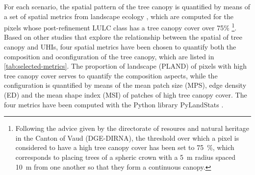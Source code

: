 \documentclass[10pt,letterpaper]{article}
\begin{document}
For each scenario, the spatial pattern of the tree canopy is quantified by means of a set of spatial metrics from landscape ecology \cite{o1988indices,mcgarigal2012fragstats}, which are computed for the pixels whose post-refinement LULC class has a tree canopy cover over 75\% \footnote{Following the advice given by the directorate of resoures and natural heritage in the Canton of Vaud (DGE-DIRNA), the threshold over which a pixel is considered to have a high tree canopy cover has been set to 75~\%, which corresponds to placing trees of a spheric crown with a 5~m radius spaced 10~m from one another so that they form a continuous canopy.}.
Based on other studies that explore the relationship between the spatial of tree canopy and UHIs, four spatial metrics have been chosen to quantify both the composition and oconfiguration of the tree canopy, which are listed in \autoref{tab:selected-metrics}. The proportion of landscape (PLAND) of pixels with high tree canopy cover serves to quantify the composition aspects, while the configuration is quantified by means of the mean patch size (MPS), edge density (ED) and the mean shape index (MSI) of patches of high tree canopy cover. The four metrics have been computed with the Python library PyLandStats \cite{bosch2019pylandstats}.
\end{document}
